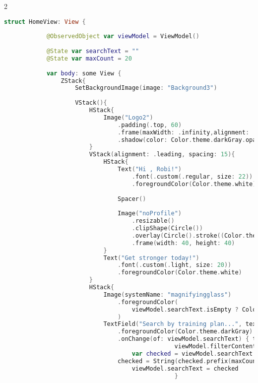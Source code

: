 \begin{spacing}{2}
\end{spacing}
\begin{minipage}{\textwidth}
    \linespread{0.8}\selectfont
    \begin{lstlisting}[language=swift]
        struct HomeView: View {
            
            @ObservedObject var viewModel = ViewModel()
            
            @State var searchText = ""
            @State var maxCount = 20
             
            var body: some View {
                ZStack{
                    SetBackgroundImage(image: "Background3")
                    
                    VStack(){
                        HStack{
                            Image("Logo2")
                                .padding(.top, 60)
                                .frame(maxWidth: .infinity,alignment: .center)
                                .shadow(color: Color.theme.darkGray.opacity(0.25), radius: 5, x: 0, y: 4)
                        }
                        VStack(alignment: .leading, spacing: 15){
                            HStack{
                                Text("Hi , Robi!")
                                    .font(.custom(.regular, size: 22))
                                    .foregroundColor(Color.theme.white)
                                
                                Spacer()
                                
                                Image("noProfile")
                                    .resizable()
                                    .clipShape(Circle())
                                    .overlay(Circle().stroke((Color.theme.white), lineWidth: 2))
                                    .frame(width: 40, height: 40)
                            }
                            Text("Get stronger today!")
                                .font(.custom(.light, size: 20))
                                .foregroundColor(Color.theme.white)
                        }
                        HStack{
                            Image(systemName: "magnifyingglass")
                                .foregroundColor(
                                    viewModel.searchText.isEmpty ? Color.theme.darkGray : Color.theme.lighBlue
                                )     
                            TextField("Search by training plan...", text: $viewModel.searchText)
                                .foregroundColor(Color.theme.darkGray)
                                .onChange(of: viewModel.searchText) { text in
                                                viewModel.filterContent()
                                    var checked = viewModel.searchText.trimmingCharacters(in: CharacterSet.alphanumerics.inverted)
                                checked = String(checked.prefix(maxCount))
                                    viewModel.searchText = checked
                                                }
                                

\end{lstlisting}
\end{minipage}
